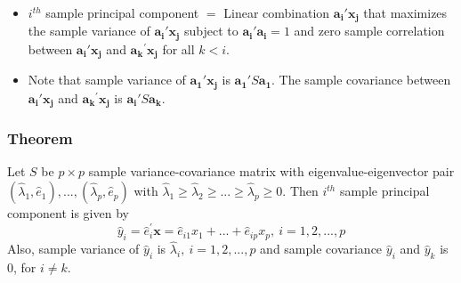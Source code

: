\documentclass[10pt]{beamer} %
\begin{document}
\begin{frame}
   \begin{itemize}
      \item $i^{th}$ sample principal component $=$ Linear combination
         $\boldsymbol{a_{i}'}\boldsymbol{x_j}$ that maximizes the sample
         variance of $\boldsymbol{a_{i}'}\boldsymbol{x_j}$ subject to
         $\boldsymbol{a_{i}'}\boldsymbol{a_i} = 1$ and zero sample correlation
         between $\boldsymbol{a_{i}'}\boldsymbol{x_j}$ and
         $\boldsymbol{a_k}^{'}\boldsymbol{x_j}$ for all $k<i$.
         \vspace{0.75cm}
      \item Note that sample variance of $\boldsymbol{a_{1}'}\boldsymbol{x_j}$
         is $\boldsymbol{a_{1}'} S \boldsymbol{a_1}$. The sample covariance
         between $\boldsymbol{a_{i}'}\boldsymbol{x_j}$ and
         $\boldsymbol{a_k}^{'}\boldsymbol{x_j}$ is
         $\boldsymbol{a_{i}'}S\boldsymbol{a_k}$. 
   \end{itemize}  
\end{frame}

\begin{frame}
   \frametitle{Theorem}
   Let $S$ be $p \times p$ sample variance-covariance matrix with eigenvalue-eigenvector
   pair $(\hat{\lambda}_1,\hat{e}_1),...,(\hat{\lambda}_p,\hat{e}_p)$ with
   $\hat{\lambda}_1 \geq \hat{\lambda}_2 \geq ... \geq \hat{\lambda}_p \geq 0$.
   Then $i^{th}$ sample principal component is given by
   \begin{equation*}
      \hat{y}_i = \hat{e}_i^{'}\boldsymbol{x} = \hat{e}_{i1}x_1+...+\hat{e}_{ip}x_p,\ i=1,2,...,p
   \end{equation*}
   \vspace{0.25cm}
   Also, sample variance of $\hat{y}_i$ is $\hat{\lambda}_i,\ i=1,2,...,p$ and sample
   covariance $\hat{y}_i$ and $\hat{y}_k$ is $0$, for $i \neq k$.
\end{frame}
\end{document}
